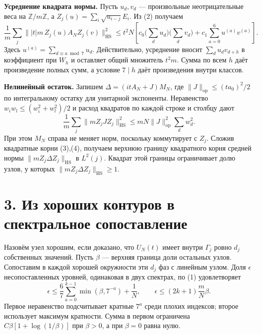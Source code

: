 \documentclass[11pt,a4paper]{article}
\newcommand{\Z}{\mathbb Z}
\newcommand{\sect}[1]{\section*{\sffamily\color{ink}#1}}
\newcommand{\subt}[1]{\par\medskip\noindent\textbf{#1.}\quad}
\newcommand{\op}{\mathrm{op}}
\newcommand{\HS}{\mathrm{HS}}
\begin{document}
\subt{Усреднение квадрата нормы}
Пусть \(u_d,v_d\) --- произвольные неотрицательные веса на \(\Z/m\Z\), а \(Z_j(u)=\sum_i\sqrt{u_{i-j}}E_i\). Из (2) получаем
\begin{equation}
\frac1m\sum_j \big\||t|m\,Z_j(u) A_N Z_j(v)\big\|_{\HS}^2
\le t^2 N\left[c_0\Big(\sum_d u_d\Big)\Big(\sum_d v_d\Big)
               +c_1\sum_{a=0}^6 u^{(a)}v^{(a)}\right].
                                                             \tag{3}
\end{equation}
Здесь \(u^{(a)}=\sum_{d\equiv a\bmod7}u_d\). Действительно, усреднение вносит \(\sum_d u_d v_{d+h}\) в коэффициент при \(W_h\) и оставляет общий множитель \(t^2 m\). Сумма по всем \(h\) даёт произведение полных сумм, а условие \(7\mid h\) даёт произведения внутри классов.

\subt{Нелинейный остаток}
Запишем \(\Delta=(itA_N+J)M_N\), где \(\|J\|_{\op}\le (t a_0)^2/2\) по интегральному остатку для унитарной экспоненты. Неравенство \(w_i w_l\le(w_i^2+w_l^2)/2\) и расход квадратов по каждой строке и столбцу дают
\begin{equation}
   \frac1m\sum_j\|m Z_j J Z_j\|_{\HS}^2
          \le m N\|J\|_{\op}^2\sum_d w_d^2.                     \tag{4}
\end{equation}
При этом \(M_N\) справа не меняет норм, поскольку коммутирует с \(Z_j\). Сложив квадратные корни (3),(4), получаем верхнюю границу квадратного корня средней нормы \(\|m Z_j\Delta Z_j\|_{\HS}\) в \(L^2(j)\). Квадрат этой границы ограничивает долю узлов, у которых \(\|m Z_j\Delta Z_j\|_{\HS}\ge1\).
\newpage
\sect{3. Из хороших контуров в спектральное сопоставление}
Назовём узел хорошим, если доказано, что \(U_N(t)\) имеет внутри \(\Gamma_j\) ровно \(d_j\) собственных значений. Пусть \(\beta\) --- верхняя граница доли остальных узлов. Сопоставим в каждой хорошей окружности эти \(d_j\) фаз с линейным узлом. Доля \(\epsilon\) несопоставленных уровней, одинаковая в двух спектрах, по (1) удовлетворяет
\begin{equation}
     \epsilon \le \frac67\sum_{a=0}^{k-1}\min(\beta,7^{-a})+\frac1N,
       \qquad \epsilon\le(2k+1)\frac{m}{N}\beta .               \tag{5}
\end{equation}
Первое неравенство подсчитывает кратные \(7^a\) среди плохих индексов; второе использует максимум кратности. Сумма в первом ограничена \(C\beta[1+\log(1/\beta)]\) при \(\beta>0\), а при \(\beta=0\) равна нулю.
\end{document}
